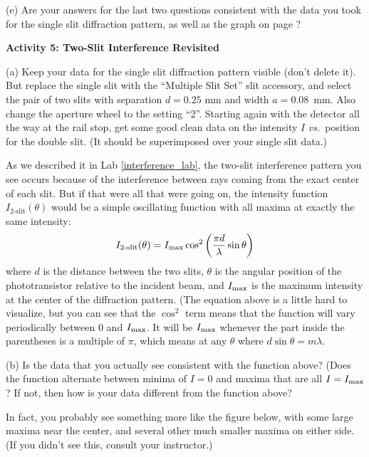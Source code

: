 (e) Are your answers for the last two questions consistent with the data you took for the single slit diffraction pattern, as well as the graph on page \pageref{fraunhofer_graph}?
\answerspace{0.4in}


\pagebreak[2]
\medskip
\textbf{Activity 5: Two-Slit Interference Revisited}

(a) Keep your data for the single slit diffraction pattern visible (don't delete it).  But replace the single slit with the ``Multiple Slit Set'' slit accessory, and select the pair of two slits with separation $d=0.25$ mm and width $a=0.08$~mm.  Also change the aperture wheel to the setting ``2''.  Starting again with the detector all the way at the rail stop, get some good clean data on the intensity $I$ \textit{vs.}~position for the double slit.  (It should be superimposed over your single slit data.)

As we described it in Lab \ref{interference_lab}, the two-slit interference pattern you see occurs because of the interference between rays coming from the exact center of each slit.  But if that were all that were going on,
the intensity function $I_{\operatorname{2-slit}}(\theta)$ would be a simple oscillating function with all maxima at exactly the same intensity:
\begin{displaymath} 
I_{\operatorname{2-slit}}(\theta) = I_{\rm{max}} \cos^2 \left (\frac {\pi d} {\lambda} \sin \theta \right) 
\end{displaymath}
where $d$ is the distance between the two slits, \( \theta  \) is the angular
position of the phototransistor relative to the incident beam, and $I_{\rm{max}}$
is the maximum intensity at the center of the diffraction pattern. 
(The equation above is a little hard to visualize, but you can see that the $\cos ^2$ term means that the function will vary periodically between 0 and $I_{\rm max}$.  
It will be $I_{\rm max}$ whenever the part inside the parentheses is a multiple of $\pi$, 
which means at any $\theta$ where $d \sin \theta = m \lambda$. 

(b) Is the data that you actually see consistent with the function above?  (Does the function alternate between minima of $I=0$ and maxima that are all $I=I_{\rm max}$?  If not, then how is your data different from the function above?
\answerspace{0.6in}

In fact, you probably see something more like the figure below, with some large maxima near the center, and several other much smaller maxima on either side.  (If you didn't see this, consult your instructor.)

